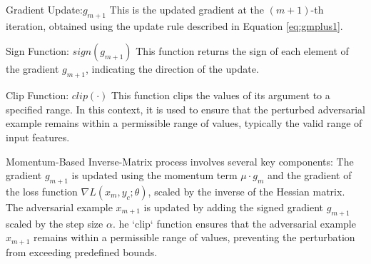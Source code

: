 Gradient Update:$g_{m+1}$ This is the updated gradient at the \((m+1)\)-th iteration, obtained using the update rule described in Equation \ref{eq:gmplus1}.

Sign Function: ${sign}(g_{m+1})$ This function returns the sign of each element of the gradient \(g_{m+1}\), indicating the direction of the update.

Clip Function: ${clip}(\cdot)$ This function clips the values of its argument to a specified range. In this context, it is used to ensure that the perturbed adversarial example remains within a permissible range of values, typically the valid range of input features.

Momentum-Based Inverse-Matrix process involves several key components:
The gradient \(g_{m+1}\) is updated using the momentum term \(\mu \cdot g_m\) and the gradient of the loss function \(\nabla L(x_m, y_c; \theta)\), scaled by the inverse of the Hessian matrix.
The adversarial example \(x_{m+1}\) is updated by adding the signed gradient \(g_{m+1}\) scaled by the step size \(\alpha\).
he `clip` function ensures that the adversarial example \(x_{m+1}\) remains within a permissible range of values, preventing the perturbation from exceeding predefined bounds.